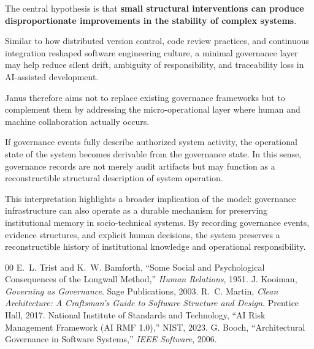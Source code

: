\documentclass[conference]{IEEEtran}
\begin{document}
The central hypothesis is that \textbf{small structural interventions can produce disproportionate improvements in the stability of complex systems}.

Similar to how distributed version control, code review practices, and continuous integration reshaped software engineering culture, a minimal governance layer may help reduce silent drift, ambiguity of responsibility, and traceability loss in AI-assisted development.

Janus therefore aims not to replace existing governance frameworks but to complement them by addressing the micro-operational layer where human and machine collaboration actually occurs.

If governance events fully describe authorized system activity, the operational state of the system becomes derivable from the governance state. In this sense, governance records are not merely audit artifacts but may function as a reconstructible structural description of system operation.

This interpretation highlights a broader implication of the model: governance infrastructure can also operate as a durable mechanism for preserving institutional memory in socio-technical systems. By recording governance events, evidence structures, and explicit human decisions, the system preserves a reconstructible history of institutional knowledge and operational responsibility.

\begin{thebibliography}{00}
 E.~L. Trist and K.~W. Bamforth, ``Some Social and Psychological Consequences of the Longwall Method,'' \emph{Human Relations}, 1951.
 J. Kooiman, \emph{Governing as Governance}. Sage Publications, 2003.
 R.~C. Martin, \emph{Clean Architecture: A Craftsman's Guide to Software Structure and Design}. Prentice Hall, 2017.
 National Institute of Standards and Technology, ``AI Risk Management Framework (AI RMF 1.0),'' NIST, 2023.
 G. Booch, ``Architectural Governance in Software Systems,'' \emph{IEEE Software}, 2006.
\end{thebibliography}
\end{document}
